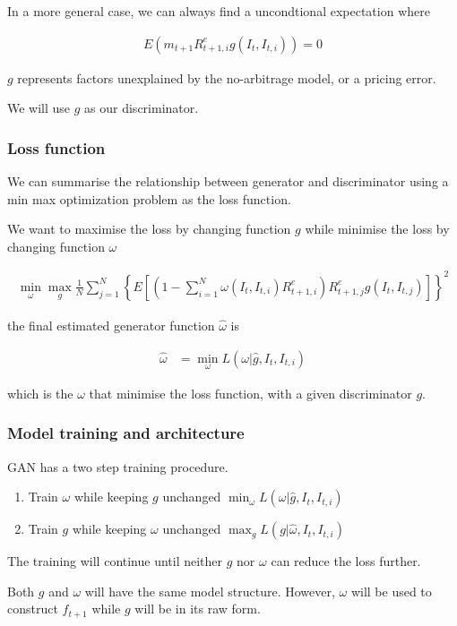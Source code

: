 \documentclass[11pt, oneside]{article}   	%
\begin{document}
In a more general case, we can always find a uncondtional expectation where 

\begin{align*}
    E(m_{t+1}R^e_{t+1, i}g(I_t, I_{t, i}))=0
\end{align*}

$g$ represents factors unexplained by the no-arbitrage model, or a pricing error.

We will use $g$ as our discriminator.

\subsubsection{Loss function}

We can summarise the relationship between generator and discriminator using a 
min max optimization problem as the loss function.

We want to maximise the loss by changing function $g$ while minimise the loss by changing function $\omega$

\begin{align*}
    \min_{\omega} \max_{g} \frac{1}{N} \sum_{j=1}^N \left\{
    E \left[ 
        \left( 1 - \sum_{i=1}^N \omega(I_t, I_{t, i}) R^e_{t+1, i} \right)
        R^e_{t+1, j}g(I_t, I_{t, j})
    \right] \right\}^2
\end{align*}

the final estimated generator function $\hat\omega$ is

\begin{align*}
    \hat\omega &= \min_{\omega} L(\omega|\hat{g}, I_t, I_{t, i})
\end{align*}

which is the $\omega$ that minimise the loss function, with a given discriminator $g$.

\subsubsection{Model training and architecture}

GAN has a two step training procedure.

\begin{enumerate}
    \item Train $\omega$ while keeping $g$ unchanged
        \subitem $\min_{\omega} L(\omega|\hat{g}, I_t, I_{t,i})$
    \item Train $g$ while keeping $\omega$ unchanged
        \subitem $\max_{g} L(g|\hat\omega, I_t, I_{t,i})$
\end{enumerate}

The training will continue until neither $g$ nor
$\omega$ can reduce the loss further.

Both $g$ and $\omega$ will have the same model structure.
However, $\omega$ will be used to construct $f_{t+1}$ while $g$ will be in its raw form.
\end{document}
